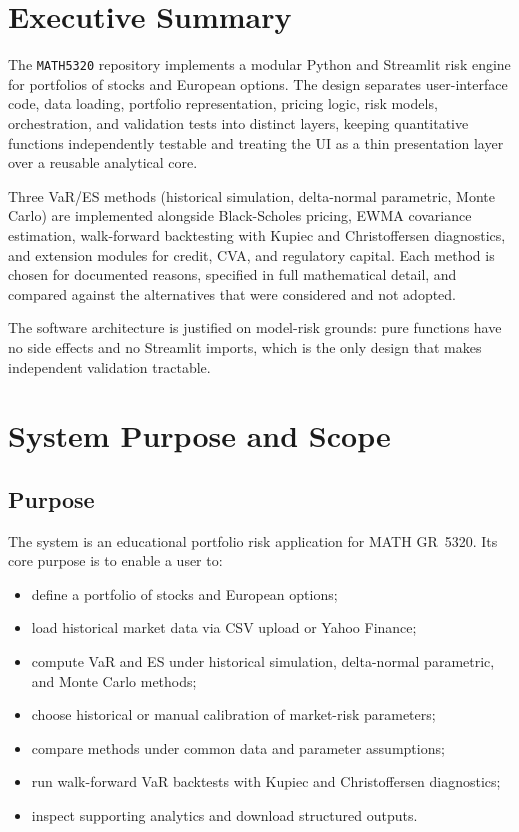\documentclass[11pt]{article}
\newcommand{\code}[1]{\texttt{#1}}
\begin{document}
\tableofcontents
\clearpage

\section{Executive Summary}

The \code{MATH5320} repository implements a modular Python and Streamlit
risk engine for portfolios of stocks and European options.  The design
separates user-interface code, data loading, portfolio representation,
pricing logic, risk models, orchestration, and validation tests into
distinct layers, keeping quantitative functions independently testable
and treating the UI as a thin presentation layer over a reusable
analytical core.

Three VaR/ES methods (historical simulation, delta-normal parametric,
Monte Carlo) are implemented alongside Black-Scholes pricing, EWMA
covariance estimation, walk-forward backtesting with Kupiec and
Christoffersen diagnostics, and extension modules for credit, CVA, and
regulatory capital.  Each method is chosen for documented reasons,
specified in full mathematical detail, and compared against the
alternatives that were considered and not adopted.

The software architecture is justified on model-risk grounds: pure
functions have no side effects and no Streamlit imports, which is the
only design that makes independent validation tractable.

\section{System Purpose and Scope}

\subsection{Purpose}

The system is an educational portfolio risk application for MATH GR~5320.
Its core purpose is to enable a user to:

\begin{itemize}
  \item define a portfolio of stocks and European options;
  \item load historical market data via CSV upload or Yahoo Finance;
  \item compute VaR and ES under historical simulation, delta-normal
    parametric, and Monte Carlo methods;
  \item choose historical or manual calibration of market-risk parameters;
  \item compare methods under common data and parameter assumptions;
  \item run walk-forward VaR backtests with Kupiec and Christoffersen diagnostics;
  \item inspect supporting analytics and download structured outputs.
\end{itemize}
\end{document}
